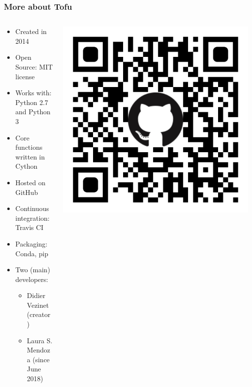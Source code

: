 \documentclass[10pt]{beamer}
\begin{document}
\begin{frame}
\frametitle{More about Tofu}

\begin{columns}
\begin{column}{0.65\textwidth}
\begin{itemize}
	\item Created in 2014
	\item Open Source: MIT license
	\item Works with: Python 2.7 and Python 3
	\item Core functions written in Cython
	\item Hosted on GitHub
	\item Continuous integration: Travis CI
	\item Packaging: Conda, pip
	\item Two (main) developers:
	\begin{itemize}
		\item Didier Vezinet (creator)
		\item Laura S. Mendoza (since June 2018)
	\end{itemize}
\end{itemize}
\end{column}
\begin{column}{0.35\textwidth}
\begin{center}
    	\includegraphics[width=\textwidth]{figures/qr-code.png}
\end{center}
\end{column}
\end{columns}
	
\end{frame}
\end{document}

